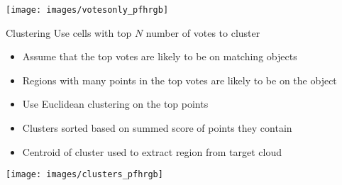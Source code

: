\documentclass{beamer}
\begin{document}
\begin{frame}
  \begin{center}
    \texttt{[image: images/votesonly\_pfhrgb]}
  \end{center}
\end{frame}
\begin{frame}{Clustering}
  Use cells with top $N$ number of votes to cluster
  \begin{itemize}
  \item Assume that the top votes are likely to be on matching objects
  \item Regions with many points in the top votes are likely to be on the object
  \item Use Euclidean clustering on the top points
  \item Clusters sorted based on summed score of points they contain
  \item Centroid of cluster used to extract region from target cloud
  \end{itemize}
\end{frame}
\begin{frame}
    \begin{center}
    \texttt{[image: images/clusters\_pfhrgb]}
  \end{center}
\end{frame}
\begin{frame}
  \begin{figure}
    \centering
    \centerline{
      }\\
    \centerline{
      }
  \end{figure}
\end{frame}
\end{document}
